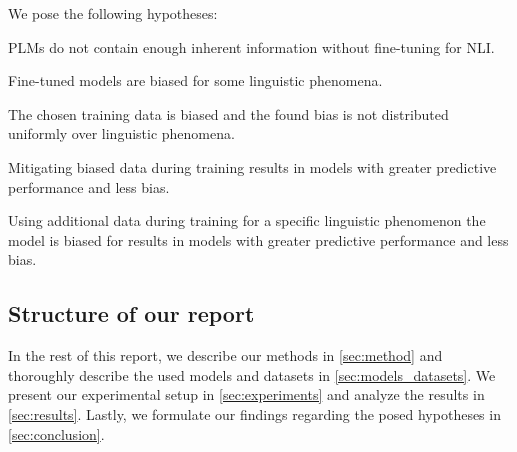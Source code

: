 \noindent
We pose the following hypotheses: \vspace*{-0.5em}
\begin{description}
  \setlength\itemsep{-0.3em}
  \item[H1] \acp{PLM} do not contain enough inherent information without fine-tuning for \ac{NLI}.
  \item[H2] Fine-tuned models are biased for some linguistic phenomena.
  \item[H3] The chosen training data is biased and the found bias is not distributed uniformly over linguistic phenomena.
  \item[H4] Mitigating biased data during training results in models with greater predictive performance and less bias.
  \item[H5] Using additional data during training for a specific linguistic phenomenon the model is biased for results in models with greater predictive performance and less bias.
\end{description}

\subsection{Structure of our report}
In the rest of this report, we describe our methods in \autoref{sec:method} and thoroughly describe the used models and datasets in \autoref{sec:models_datasets}. We present our experimental setup in \autoref{sec:experiments} and analyze the results in \autoref{sec:results}. Lastly, we formulate our findings regarding the posed hypotheses in \autoref{sec:conclusion}.